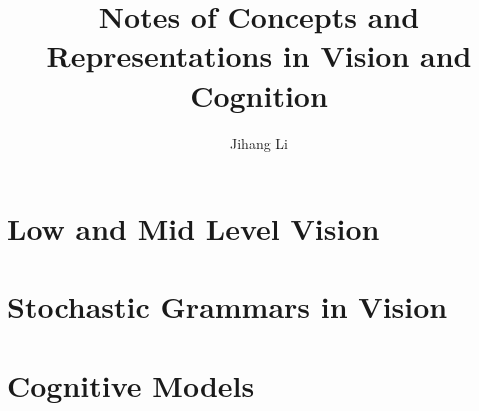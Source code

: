 \documentclass[10pt,oneside]{book}
\title{Notes of Concepts and Representations in Vision and Cognition}
\author{Jihang Li}
\begin{document}
\maketitle
\tableofcontents

\part{Low and Mid Level Vision}%


\part{Stochastic Grammars in Vision}



\part{Cognitive Models}




\end{document}
